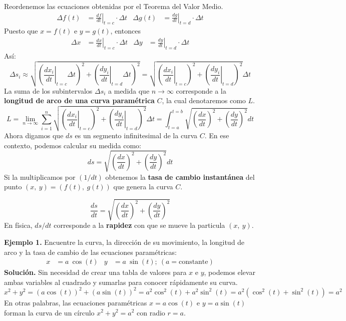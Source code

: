 \documentclass[12pt]{article}
\begin{document}
Reordenemos las ecuaciones obtenidas por el Teorema del Valor Medio.
\begin{align*}
  \Delta f(t) &= \left. \frac{df}{dt} \right|_{t = c} \cdot \Delta t & \Delta g(t) &= \left. \frac{dg}{dt} \right|_{t = d} \cdot \Delta t
\end{align*}
Puesto que $x = f(t)$ e $y = g(t)$, entonces
\begin{align*}
  \Delta x &= \left. \frac{dx}{dt} \right|_{t = c} \cdot \Delta t & \Delta y &= \left. \frac{dy}{dt} \right|_{t = d} \cdot \Delta t
\end{align*}
Así:
\[
  \Delta s_{i} \approx \sqrt{
                              \left(\left. \frac{dx_{i}}{dt} \right|_{t = c} \Delta t\right)^{2} +
                              \left(\left. \frac{dy_{i}}{dt} \right|_{t = d} \Delta t\right)^{2}
                            }
               = \sqrt{\left(\left. \frac{dx_{i}}{dt} \right|_{t = c} \right)^{2} + \left(\left. \frac{dy_{i}}{dt} \right|_{t = d} \right)^{2}}
                 \Delta t
\]
La suma de los subintervalos $\Delta s_{i}$ a medida que $n \to \infty$ corresponde a la \textbf{longitud de arco de una curva paramétrica} $C$, la cual denotaremos como $L$.
\[
  L = \lim_{n \to \infty}
       \sum_{i = 1}^{n} \sqrt{\left(\left. \frac{dx_{i}}{dt} \right|_{t = c} \right)^{2} + \left(\left. \frac{dy_{i}}{dt} \right|_{t = d} \right)^{2}}
       \Delta t
    = \int_{t = a}^{t = b} \sqrt{\left(\frac{dx}{dt}\right)^{2} + \left(\frac{dy}{dt}\right)^{2}} dt
\]
Ahora digamos que $ds$ es un segmento infinitesimal de la curva $C$. En ese contexto, podemos calcular su medida como:
\[
  ds = \sqrt{\left(\frac{dx}{dt}\right)^{2} + \left(\frac{dy}{dt}\right)^{2}} dt
\]
Si la multiplicamos por $(1/dt)$ obtenemos la \textbf{tasa de cambio instantánea} del punto $(x, \ y) = (f(t), \ g(t))$ que genera la curva $C$.

\[
  \frac{ds}{dt} = \sqrt{\left(\frac{dx}{dt}\right)^{2} + \left(\frac{dy}{dt}\right)^{2}}
\]
En física, $ds/dt$ corresponde a la \textbf{rapidez} con que se mueve la particula $(x, \ y)$.

\textbf{Ejemplo 1.} Encuentre la curva, la dirección de su movimiento, la longitud de arco y la tasa de cambio de las ecuaciones paramétricas:
\begin{align*}
  x &= a \ \cos(t) & y &= a \ \sin(t); \ (a = \text{constante})
\end{align*}
\textbf{Solución.} Sin necesidad de crear una tabla de valores para $x$ e $y$, podemos elevar ambas variables al cuadrado y sumarlas para conocer rápidamente su curva.
\[
  x^{2} + y^{2} = (a \cos(t))^{2} + (a \sin(t))^{2} = a^{2} \cos^{2}(t) + a^{2} \sin^{2}(t) = a^{2}(\cos^{2}(t) + \sin^{2}(t)) = a^{2}
\]
En otras palabras, las ecuaciones paramétricas $x = a \cos(t)$ e $y = a \sin(t)$ forman la curva de un círculo $x^{2} + y^{2} = a^{2}$ con radio $r = a$.
\end{document}
